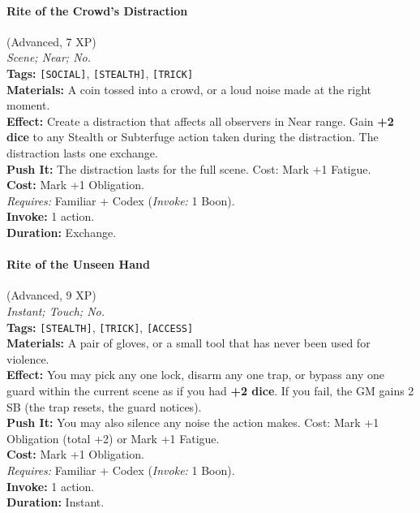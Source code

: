 \paragraph{Rite of the Crowd's Distraction} (Advanced, 7 XP) \hfill \\
\emph{Scene; Near; No.} \\
\textbf{Tags:} \texttt{[SOCIAL]}, \texttt{[STEALTH]}, \texttt{[TRICK]} \\
\textbf{Materials:} A coin tossed into a crowd, or a loud noise made at the right moment. \\
\textbf{Effect:} Create a distraction that affects all observers in Near range. Gain \textbf{+2 dice} to any Stealth or Subterfuge action taken during the distraction. The distraction lasts one exchange. \\
\textbf{Push It:} The distraction lasts for the full scene. Cost: Mark +1 Fatigue. \\
\textbf{Cost:} Mark +1 Obligation. \\
\textit{Requires:} Familiar + Codex (\textit{Invoke:} 1 Boon). \\
\textbf{Invoke:} 1 action. \\
\textbf{Duration:} Exchange.

\paragraph{Rite of the Unseen Hand} (Advanced, 9 XP) \hfill \\
\emph{Instant; Touch; No.} \\
\textbf{Tags:} \texttt{[STEALTH]}, \texttt{[TRICK]}, \texttt{[ACCESS]} \\
\textbf{Materials:} A pair of gloves, or a small tool that has never been used for violence. \\
\textbf{Effect:} You may pick any one lock, disarm any one trap, or bypass any one guard within the current scene as if you had \textbf{+2 dice}. If you fail, the GM gains 2 SB (the trap resets, the guard notices). \\
\textbf{Push It:} You may also silence any noise the action makes. Cost: Mark +1 Obligation (total +2) or Mark +1 Fatigue. \\
\textbf{Cost:} Mark +1 Obligation. \\
\textit{Requires:} Familiar + Codex (\textit{Invoke:} 1 Boon). \\
\textbf{Invoke:} 1 action. \\
\textbf{Duration:} Instant.

